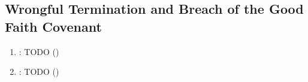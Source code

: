 \subsection{Wrongful Termination and Breach of the Good Faith Covenant}

\begin{enumerate}
    \item \textbf{\emph{}}: TODO ()
    \item \textbf{\emph{}}: TODO ()
\end{enumerate}
